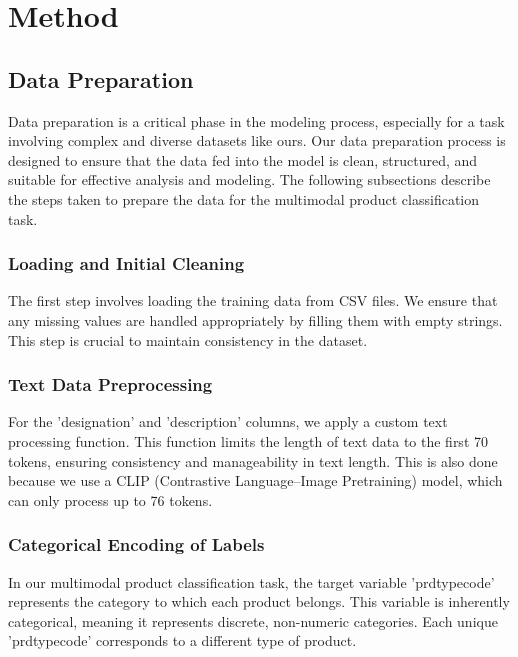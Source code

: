 \section{Method}
\label{sec:method}

\subsection{Data Preparation}
Data preparation is a critical phase in the modeling process, especially for a task involving complex and diverse datasets like ours. Our data preparation process is designed to ensure that the data fed into the model is clean, structured, and suitable for effective analysis and modeling. The following subsections describe the steps taken to prepare the data for the multimodal product classification task.

\subsubsection{Loading and Initial Cleaning}

The first step involves loading the training data from CSV files. We ensure that any missing values are handled appropriately by filling them with empty strings. This step is crucial to maintain consistency in the dataset. 

\subsubsection{Text Data Preprocessing}

For the 'designation' and 'description' columns, we apply a custom text processing function. This function limits the length of text data to the first 70 tokens, ensuring consistency and manageability in text length. This is also done because we use a CLIP (Contrastive Language–Image Pretraining) model, which can only process up to 76 tokens.

\subsubsection{Categorical Encoding of Labels}

In our multimodal product classification task, the target variable 'prdtypecode' represents the category to which each product belongs. This variable is inherently categorical, meaning it represents discrete, non-numeric categories. Each unique 'prdtypecode' corresponds to a different type of product.
  
